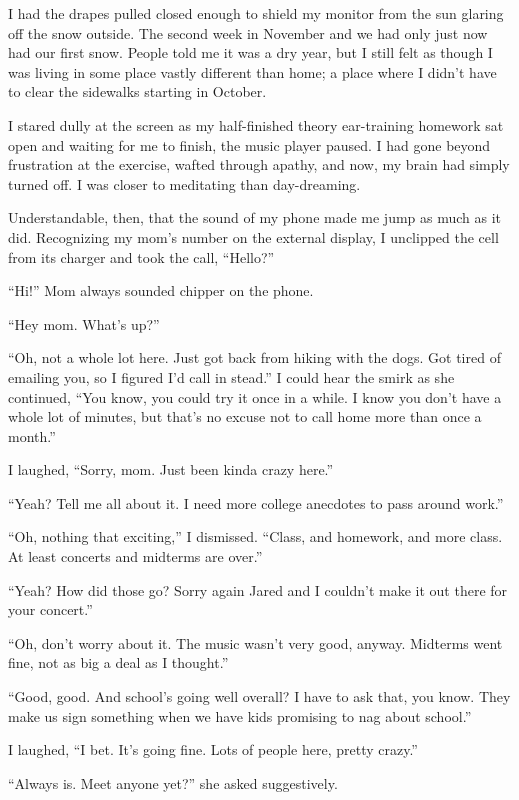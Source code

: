 I had the drapes pulled closed enough to shield my monitor from the sun glaring off the snow outside.  The second week in November and we had only just now had our first snow.  People told me it was a dry year, but I still felt as though I was living in some place vastly different than home; a place where I didn't have to clear the sidewalks starting in October.

I stared dully at the screen as my half-finished theory ear-training homework sat open and waiting for me to finish, the music player paused.  I had gone beyond frustration at the exercise, wafted through apathy, and now, my brain had simply turned off.  I was closer to meditating than day-dreaming.

Understandable, then, that the sound of my phone made me jump as much as it did.  Recognizing my mom's number on the external display, I unclipped the cell from its charger and took the call, ``Hello?''

``Hi!''  Mom always sounded chipper on the phone.

``Hey mom.  What's up?''

``Oh, not a whole lot here.  Just got back from hiking with the dogs.  Got tired of emailing you, so I figured I'd call in stead.''  I could hear the smirk as she continued, ``You know, you could try it once in a while.  I know you don't have a whole lot of minutes, but that's no excuse not to call home more than once a month.''

I laughed, ``Sorry, mom.  Just been kinda crazy here.''

``Yeah?  Tell me all about it.  I need more college anecdotes to pass around work.''

``Oh, nothing that exciting,'' I dismissed.  ``Class, and homework, and more class.  At least concerts and midterms are over.''

``Yeah?  How did those go?  Sorry again Jared and I couldn't make it out there for your concert.''

``Oh, don't worry about it.  The music wasn't very good, anyway.  Midterms went fine, not as big a deal as I thought.''

``Good, good.  And school's going well overall?  I have to ask that, you know.  They make us sign something when we have kids promising to nag about school.''

I laughed, ``I bet.  It's going fine.  Lots of people here, pretty crazy.''

``Always is.  Meet anyone yet?'' she asked suggestively.

